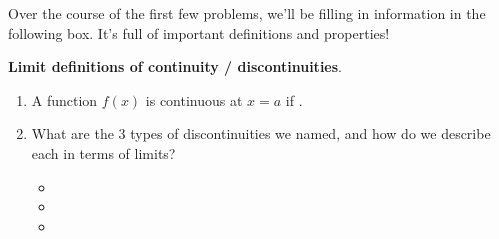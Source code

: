 \documentclass[main]{subfiles}
\begin{document}
Over the course of the first few problems, we'll be filling in information in the following box. It's full of important definitions and properties!
\begin{framed}
  \textbf{Limit definitions of continuity / discontinuities}.
  \begin{enumerate}
  \item A function $f(x)$ is continuous at $x = a$ if 
  .
  \item What are the 3 types of discontinuities we named, and how do we describe each in terms of limits?
    \begin{itemize}[topsep=0pt]
    \item \medskip {}
    \item \medskip {}
    \item \medskip {}
    \end{itemize}    
  \end{enumerate}
\end{framed}
\end{document}
